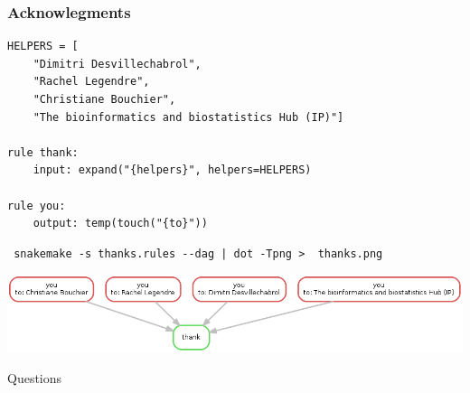 \documentclass{beamer}
\begin{document}
\begin{frame}[fragile]
\frametitle{Acknowlegments}
\centering
\pause
\begin{lstlisting}
HELPERS = [
    "Dimitri Desvillechabrol",
    "Rachel Legendre",
    "Christiane Bouchier",
    "The bioinformatics and biostatistics Hub (IP)"]

rule thank:
    input: expand("{helpers}", helpers=HELPERS)

rule you:
    output: temp(touch("{to}"))
\end{lstlisting}
\pause
\begin{block}{}
\begin{lstlisting}
 snakemake -s thanks.rules --dag | dot -Tpng >  thanks.png
\end{lstlisting}
\end{block}

\includegraphics[scale=0.3]{images/thanks.png}
\end{frame}


\begin{frame}[plain]
 \centering
 \begin{Huge}
  Questions 
 \end{Huge}
\end{frame}

 

\end{document}
